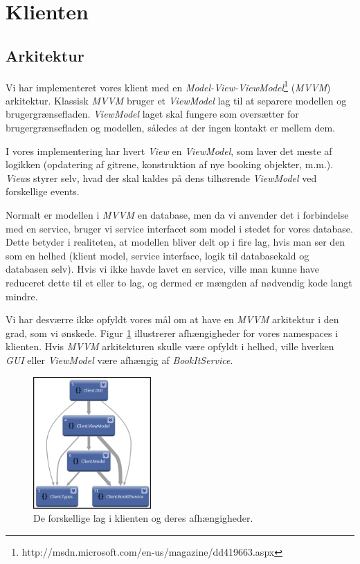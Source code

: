 \section{Klienten}
\label{Technical_Client}
\subsection*{Arkitektur}
\label{Technical_Client_Archi}
Vi har implementeret vores klient med en \textit{Model-View-ViewModel}\footnote{http://msdn.microsoft.com/en-us/magazine/dd419663.aspx} (\textit{MVVM}) arkitektur. Klassisk \textit{MVVM} bruger et \textit{ViewModel} lag til at separere modellen og brugergrænsefladen. \textit{ViewModel} laget skal fungere som oversætter for brugergrænsefladen og modellen, således at der ingen kontakt er mellem dem. 

I vores implementering har hvert \textit{View} en \textit{ViewModel}, som laver det meste af logikken (opdatering af gitrene, konstruktion af nye booking objekter, m.m.). \textit{View}s styrer selv, hvad der skal kaldes på dens tilhørende \textit{ViewModel} ved forskellige events.

Normalt er modellen i \textit{MVVM} en database, men da vi anvender det i forbindelse med en service, bruger vi service interfacet som model i stedet for vores database. Dette betyder i realiteten, at modellen bliver delt op i fire lag, hvis man ser den som en helhed (klient model, service interface, logik til databasekald og databasen selv). Hvis vi ikke havde lavet en service, ville man kunne have reduceret dette til et eller to lag, og dermed er mængden af nødvendig kode langt mindre.

Vi har desværre ikke opfyldt vores mål om at have en \textit{MVVM} arkitektur i den grad, som vi ønskede. Figur \ref{Fig:Technical_Client_Archi_nsd} illustrerer afhængigheder for vores namespaces i klienten. Hvis \textit{MVVM} arkitekturen skulle være opfyldt i helhed, ville hverken \textit{GUI} eller \textit{ViewModel} være afhængig af \textit{BookItService}.

\begin{figure}[h!]
  \centering
    \includegraphics[width=0.4\textwidth]{Chapters/Design/Technical/Images/NamespaceDependencies}
  \caption{De forskellige lag i klienten og deres afhængigheder.}
\label{Fig:Technical_Client_Archi_nsd}
\end{figure}

